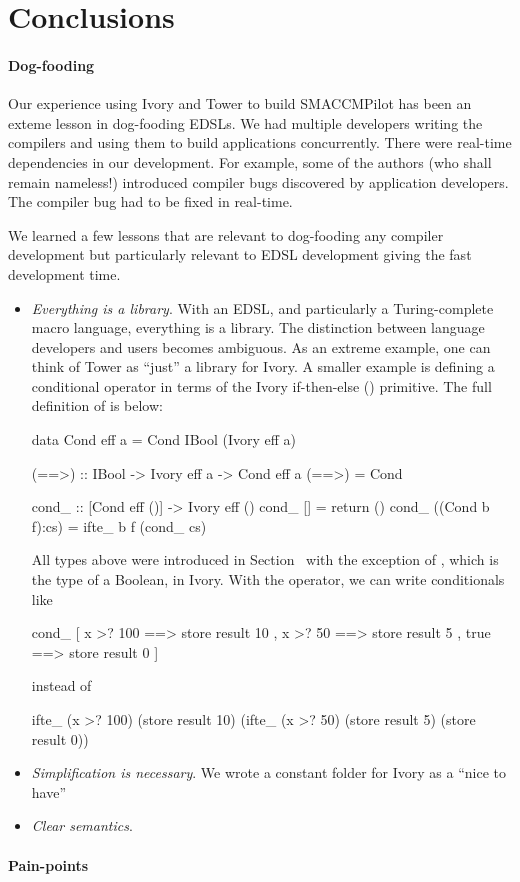 \section{Conclusions}





\paragraph{Dog-fooding}
Our experience using Ivory and Tower to build SMACCMPilot has been an exteme
lesson in dog-fooding EDSLs.  We had multiple developers writing the compilers
and using them to build applications concurrently.  There were real-time
dependencies in our development.  For example, some of the authors (who shall
remain nameless!)  introduced compiler bugs discovered by application
developers.  The compiler bug had to be fixed in real-time.

We learned a few lessons that are relevant to dog-fooding any compiler
development but particularly relevant to EDSL development giving the fast
development time.

\begin{itemize}
  \item \emph{Everything is a library}.  With an EDSL, and particularly a
    Turing-complete macro language, everything is a library.  The distinction
    between language developers and users becomes ambiguous.  As an extreme
    example, one can think of Tower as ``just'' a library for Ivory.  A smaller
    example is defining a conditional operator in terms of the Ivory
    if-then-else () primitive.  The full definition of  is below:
    \begin{code}
data Cond eff a = Cond IBool (Ivory eff a)

(==>) :: IBool -> Ivory eff a -> Cond eff a
(==>) = Cond

cond_ :: [Cond eff ()] -> Ivory eff ()
cond_ [] = return ()
cond_ ((Cond b f):cs) = ifte_ b f (cond_ cs)
    \end{code}
\noindent
All types above were introduced in Section~\cite{sec:ivory} with the exception
of , which is the type of a Boolean, in Ivory.  With the 
operator, we can write conditionals like
\begin{code}
cond_ [ x >? 100 ==> store result 10
      , x >? 50  ==> store result 5
      , true     ==> store result 0 ]
\end{code}
\noindent
instead of
\begin{code}
 ifte_ (x >? 100)
   (store result 10)
   (ifte_ (x >? 50)
     (store result 5)
       (store result 0))
\end{code}

  \item \emph{Simplification is necessary}.
We wrote a constant folder for Ivory as a ``nice to have''

  \item \emph{Clear semantics}.
\end{itemize}

\paragraph{Pain-points}



